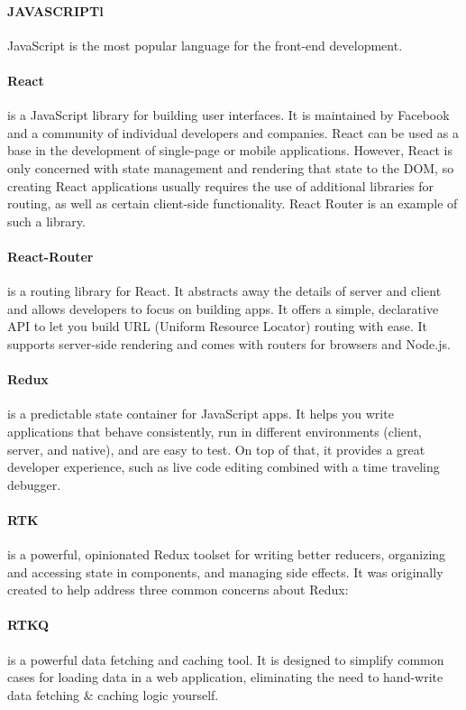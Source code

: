 \paragraph{JAVASCRIPTl}
JavaScript is the most popular language for the front-end development. 


\paragraph{React} 
is a JavaScript library for building user interfaces. 
It is maintained by Facebook and a community of individual developers and companies.
React can be used as a base in the development of single-page or mobile applications.
However, React is only concerned with state management and rendering that state to the DOM,
so creating React applications usually requires the use of additional libraries for routing,
as well as certain client-side functionality.
React Router is an example of such a library.


\paragraph{React-Router} is a routing library for React.
It abstracts away the details of server and client and allows developers to focus on building apps.
It offers a simple, declarative API to let you build URL (Uniform Resource Locator) routing with ease.
It supports server-side rendering and comes with routers for browsers and Node.js.


\paragraph{Redux} is a predictable state container for JavaScript apps.
It helps you write applications that behave consistently, run in different environments (client, server, and native),
and are easy to test.
On top of that, it provides a great developer experience, such as live code editing combined with a time traveling debugger.


\paragraph{RTK} is a powerful, opinionated Redux toolset for writing better reducers,
organizing and accessing state in components, and managing side effects.
It was originally created to help address three common concerns about Redux:


\paragraph{RTKQ} is a powerful data fetching and caching tool.
It is designed to simplify common cases for loading data in a web application, 
eliminating the need to hand-write data fetching \& caching logic yourself.


